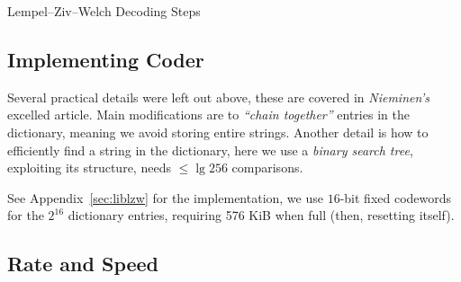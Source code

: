 \documentclass[a4paper, twocolumn]{article}
\begin{document}
        \newpage

        \begin{algorithm}
            \begin{algorithmic}
                    \ELSE
                    \ENDIF
                \ENDWHILE
            \end{algorithmic}
            \caption{Lempel--Ziv--Welch Decoding Steps}
            \label{alg:lzwx}
        \end{algorithm}
        \vspace{-0.2in}
        \subsection{Implementing Coder} \label{sec:lzw_implementing_coder}

        Several practical details were left out above, these are covered in \emph{Nieminen's}~\cite{nieminen2007efficient} excelled article. Main modifications are to \emph{``chain together''} entries in the dictionary, meaning we avoid storing entire strings. Another detail is how to efficiently find a string in the dictionary, here we use a \emph{binary search tree}, exploiting its structure, needs \(\leq\lg 256\) comparisons.

        See Appendix~\ref{sec:liblzw} for the implementation, we use \(16\)-bit fixed codewords for the \(2^{16}\) dictionary entries, requiring 576 KiB when full (then, resetting itself).

        \vspace{-0.146in}
        \subsection{Rate and Speed} \label{sec:lzw_rate_and_speed}
\end{document}
